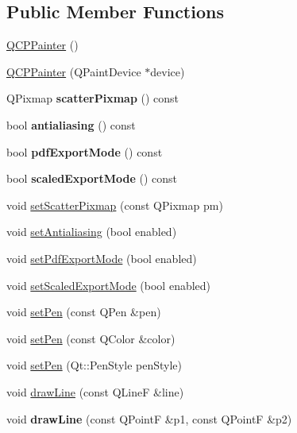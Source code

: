 \subsection*{Public Member Functions}
\begin{DoxyCompactItemize}
\item 
\hyperlink{classQCPPainter_a3c52cb0f43f34573d29bea487da28fe8}{Q\-C\-P\-Painter} ()
\item 
\hyperlink{classQCPPainter_ae58dbb1795ddc4351ab324dc9898aa22}{Q\-C\-P\-Painter} (Q\-Paint\-Device $\ast$device)
\item 
\hypertarget{classQCPPainter_a4bfe30a2c2391dd9ee387f366f4ee26f}{Q\-Pixmap {\bfseries scatter\-Pixmap} () const }\label{classQCPPainter_a4bfe30a2c2391dd9ee387f366f4ee26f}

\item 
\hypertarget{classQCPPainter_a13370d7996315a7150be2fc868da3d4a}{bool {\bfseries antialiasing} () const }\label{classQCPPainter_a13370d7996315a7150be2fc868da3d4a}

\item 
\hypertarget{classQCPPainter_ac272648ed66f0602f2250de45cbbeb33}{bool {\bfseries pdf\-Export\-Mode} () const }\label{classQCPPainter_ac272648ed66f0602f2250de45cbbeb33}

\item 
\hypertarget{classQCPPainter_ac888ac599da0583b29c8b687ff931530}{bool {\bfseries scaled\-Export\-Mode} () const }\label{classQCPPainter_ac888ac599da0583b29c8b687ff931530}

\item 
void \hyperlink{classQCPPainter_a0f636de68b40d2e169ab15a8ca067107}{set\-Scatter\-Pixmap} (const Q\-Pixmap pm)
\item 
void \hyperlink{classQCPPainter_aaba1deb9188244d9ea65b035112b4d05}{set\-Antialiasing} (bool enabled)
\item 
void \hyperlink{classQCPPainter_ae0931c24883ce8ea53103d3b80e0de56}{set\-Pdf\-Export\-Mode} (bool enabled)
\item 
void \hyperlink{classQCPPainter_a256e886e856ae696503aeacae91535cd}{set\-Scaled\-Export\-Mode} (bool enabled)
\item 
void \hyperlink{classQCPPainter_af9c7a4cd1791403901f8c5b82a150195}{set\-Pen} (const Q\-Pen \&pen)
\item 
void \hyperlink{classQCPPainter_a5c4d88f21564e156e88ef807f7cf0003}{set\-Pen} (const Q\-Color \&color)
\item 
void \hyperlink{classQCPPainter_a25e76095aae41da0d08035060e5f81ca}{set\-Pen} (Qt\-::\-Pen\-Style pen\-Style)
\item 
void \hyperlink{classQCPPainter_a0b4b1b9bd495e182c731774dc800e6e0}{draw\-Line} (const Q\-Line\-F \&line)
\item 
\hypertarget{classQCPPainter_ad1638db27929491b3f1beb74d6cbad5e}{void {\bfseries draw\-Line} (const Q\-Point\-F \&p1, const Q\-Point\-F \&p2)}\label{classQCPPainter_ad1638db27929491b3f1beb74d6cbad5e}


\end{DoxyCompactItemize}
